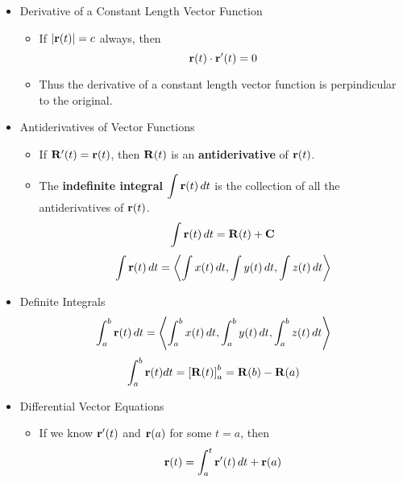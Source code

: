 \begin{itemize}
  \item Derivative of a Constant Length Vector Function
    \begin{itemize}
      \item If $|\mathbf{r}(t)|=c$ always, then \[\mathbf{r}(t) \cdot \mathbf{r}'(t) = 0\]
      \item Thus the derivative of a constant length vector function is perpindicular to the original.
    \end{itemize}
  

    \item Antiderivatives of Vector Functions
      \begin{itemize}
        \item If $\mathbf{R}'(t)=\mathbf{r}(t)$, then $\mathbf{R}(t)$ is an \textbf{antiderivative} of $\mathbf{r}(t)$.
        \item The \textbf{indefinite integral} $\displaystyle \int \mathbf{r}(t) \,d{t}$ is the collection of all the antiderivatives of $\mathbf{r}(t)$.
        \[\displaystyle\int \mathbf{r}(t) \,d{t} = \mathbf{R}(t) + \mathbf{C}\]
        \[\displaystyle\int \mathbf{r}(t) \,d{t} = \left<\int x(t) \,d{t}, \int y(t) \,d{t}, \int z(t) \,d{t} \right> \]
      \end{itemize}

    \item Definite Integrals
      \[\displaystyle\int^b_a \mathbf{r}(t) \,d{t} = \left<\int^b_a x(t) \,d{t}, \int^b_a y(t) \,d{t}, \int^b_a z(t) \,d{t} \right> \]
      \[\int^b_a \mathbf{r}(t)dt = \left[\mathbf{R}(t)\right]^b_a=\mathbf{R}(b)-\mathbf{R}(a)\]

    \item Differential Vector Equations
      \begin{itemize}
      \item If we know $\mathbf{r}'(t)$ and $\mathbf{r}(a)$ for some $t=a$, then \[\mathbf{r}(t)=\int_a^t\mathbf{r}'(t)\,dt+\mathbf{r}(a)\]
      \end{itemize}
    

\end{itemize}
